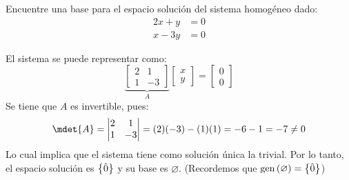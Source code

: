 \begin{exercise}
	Encuentre una base para el espacio solución del sistema homogéneo dado:
	\begin{align*}
		2x + y &= 0\\
		x - 3y &= 0
	\end{align*}
\end{exercise}
\begin{solution}
	El sistema se puede representar como:
	\[
		\underbrace{\begin{bmatrix}
			2 & 1\\
			1 & -3
		\end{bmatrix}}_{A}
		\begin{bmatrix}
			x\\
			y
		\end{bmatrix}
		=
		\begin{bmatrix}
			0\\
			0
		\end{bmatrix}
	\]
	Se tiene que $A$ es invertible, pues:
	\[
		\mdet{A} =
		\begin{vmatrix}
			2 & 1\\
			1 & -3
		\end{vmatrix}
		= (2)(-3) - (1)(1) = -6 - 1 = -7\neq 0
	\]
	Lo cual implica que el sistema tiene como solución única la trivial. Por lo tanto, el espacio solución es $\left\{ \hat{0} \right\}$ y su base es $\varnothing$. (Recordemos que $\mgen{\varnothing} =\set{\hat{0}}$)
\end{solution}